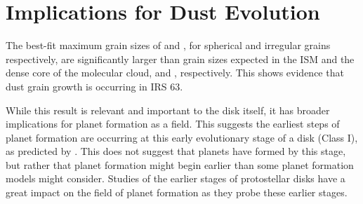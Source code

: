  
\section{Implications for Dust Evolution}

The best-fit maximum grain sizes of \sbest and \ibest, for spherical and irregular grains respectively, are significantly larger than grain sizes expected in the ISM and the dense core of the molecular cloud, \ism and \dccNS, respectively. This shows evidence that dust grain growth is occurring in IRS 63. 

While this result is relevant and important to the disk itself, it has broader implications for planet formation as a field. This suggests the earliest steps of planet formation are occurring at this early evolutionary stage of a disk (Class I), as predicted by \cite{Dom2020}. This does not suggest that planets have formed by this stage, but rather that planet formation might begin earlier than some planet formation models might consider. Studies of the earlier stages of protostellar disks have a great impact on the field of planet formation as they probe these earlier stages.




